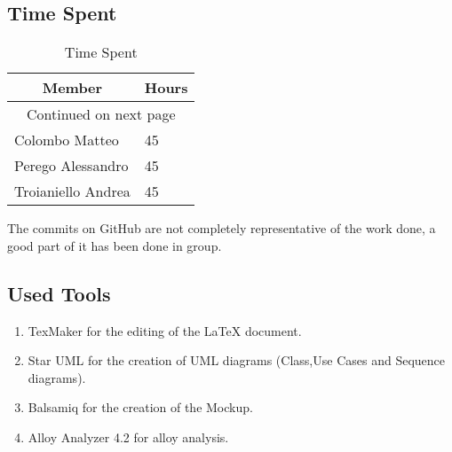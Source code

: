 \subsection{Time Spent}

\begin{center}
\begin{longtable}{|p{8cm} | p{5cm}|}
\hline \multicolumn{1}{|c|}{\textbf{Member}} & \multicolumn{1}{c|}{\textbf{Hours}} \\ \hline 
\endfirsthead
\hline
\endhead
\hline \multicolumn{2}{c}{{Continued on next page}} \\
\endfoot
\hline
\caption{Time Spent}
\label{ref:timespent}
\endlastfoot
Colombo Matteo & 45 \\
\hline 
Perego Alessandro & 45 \\ 
\hline
Troianiello Andrea & 45 \\
\end{longtable}
\end{center}
The commits on GitHub are not completely representative of the work done, a good part of it has been done in group.

\subsection{Used Tools}

\begin{enumerate}
\item
TexMaker for the editing of the LaTeX document.
\item
Star UML for the creation of UML diagrams (Class,Use Cases and Sequence diagrams).
\item
Balsamiq for the creation of the Mockup.
\item
Alloy Analyzer 4.2 for alloy analysis.
\end{enumerate}